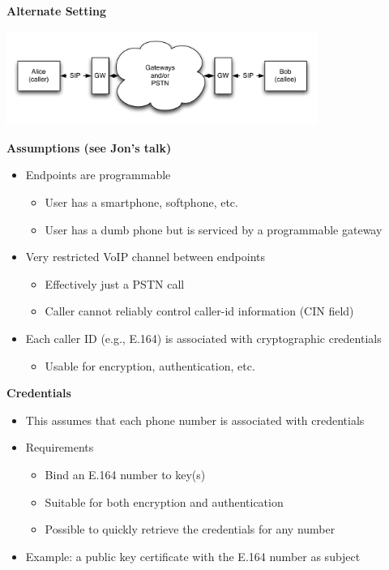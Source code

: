 \documentclass[helvetica]{seminar}
\newcommand{\heading}[1]{%
  \begin{center} 
    \large\bf 
    #1 
  \end{center} 
  \vspace{.4 in}}
\begin{document}
\begin{slide}
\heading{Alternate Setting}

\begin{center}
\includegraphics[width=4in]{setting2}
\end{center}
\end{slide}


\begin{slide}
\heading{Assumptions (see Jon's talk)}

\begin{itemize}
\item Endpoints are programmable
  \begin{itemize}
  \item User has a smartphone, softphone, etc.
  \item User has a dumb phone but is serviced by a programmable gateway
  \end{itemize}

\item Very restricted VoIP channel between endpoints
  \begin{itemize}
  \item Effectively just a PSTN call
  \item Caller cannot reliably control caller-id information (CIN field)
  \end{itemize}

\item Each caller ID (e.g., E.164) is associated with cryptographic credentials
  \begin{itemize}
  \item Usable for encryption, authentication, etc.
  \end{itemize}
\end{itemize}
\end{slide}



\begin{slide}
\heading{Credentials}

\begin{itemize}
\item This assumes that each phone number is associated with credentials
\item Requirements
  \begin{itemize}
  \item Bind an E.164 number to key(s)
  \item Suitable for both encryption and authentication
  \item Possible to quickly retrieve the credentials for any number
  \end{itemize}

\item Example: a public key certificate with the E.164 number as subject
\end{itemize}
\end{slide}
\end{document}

